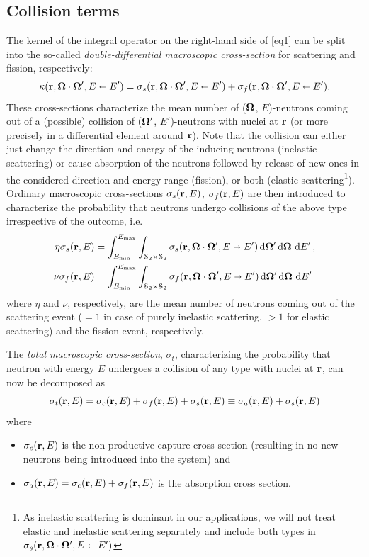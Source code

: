 \subsection{Collision terms}
The kernel of the integral operator on the right-hand side of \eqref{eq1} can be split into the so-called
\textit{double-differential macroscopic cross-section} for scattering and fission, respectively:
\begin{equation}\label{eq:splitting}
  \kappa(\br,\bomega\cdot\bomega',E\sla E') = \sigma_s(\br,\bomega\cdot\bomega',E\sla E') +
  \sigma_f(\br,\bomega\cdot\bomega',E\sla E').
\end{equation}
These cross-sections characterize the mean number of ($\bomega$, $E$)-neutrons coming out of a (possible) collision of 
($\bomega'$, $E'$)-neutrons with nuclei at $\br$ (or more precisely in a
differential element around $\br$). Note that the collision can either just change the direction and energy of the
inducing neutrons (inelastic scattering) or cause absorption of the neutrons followed by release of
new ones in the considered direction and energy range (fission), or both (elastic scattering\footnote{As inelastic
scattering is dominant in our applications, we will not treat elastic and inelastic scattering separately and include 
both types in $\sigma_s(\br,\bomega\cdot\bomega',E\sla E')$}).
Ordinary macroscopic cross-sections $\sigma_s(\br,E)$, $\sigma_f(\br,E)$ are then introduced to characterize the
probability that neutrons undergo collisions of the above type irrespective of the outcome, i.e.
\begin{equation}\label{eq:ddifxs}
\begin{aligned}
\eta\sigma_s(\br, E) &= \intE[']{\Emin}{\Emax}{\intAA{\sigma_s(\br,\bomega\cdot\bomega', 
	E\shortrightarrow E')}},\\
\nu\sigma_f(\br, E) &= \intE[']{\Emin}{\Emax}{\intAA{\sigma_f(\br,\bomega\cdot\bomega', 
	E\shortrightarrow E')}}
\end{aligned}
\end{equation}
where $\eta$ and $\nu$, respectively, are the mean number of neutrons coming out of the scattering event ($=1$ in case
of purely inelastic scattering, $> 1$ for elastic scattering) and the fission event, respectively.

The \textit{total macroscopic cross-section}, $\sigma_t$, characterizing the probability that neutron with energy $E$
undergoes a collision of any type with nuclei at $\br$, can now be decomposed as 
\begin{equation}\label{eq:st}
  \sigma_t(\br,E) = \sigma_c(\br,E) + \sigma_f(\br,E) + \sigma_s(\br,E) \equiv \sigma_a(\br,E) + \sigma_s(\br,E)
\end{equation}
where
\begin{itemize}
	\item $\sigma_c(\br, E)$ is the non-productive capture cross section (resulting in no new neutrons being introduced
	into the system) and
  	\item $\sigma_a(\br, E) = \sigma_c(\br,E) + \sigma_f(\br,E)$ is the absorption cross section.
\end{itemize}

